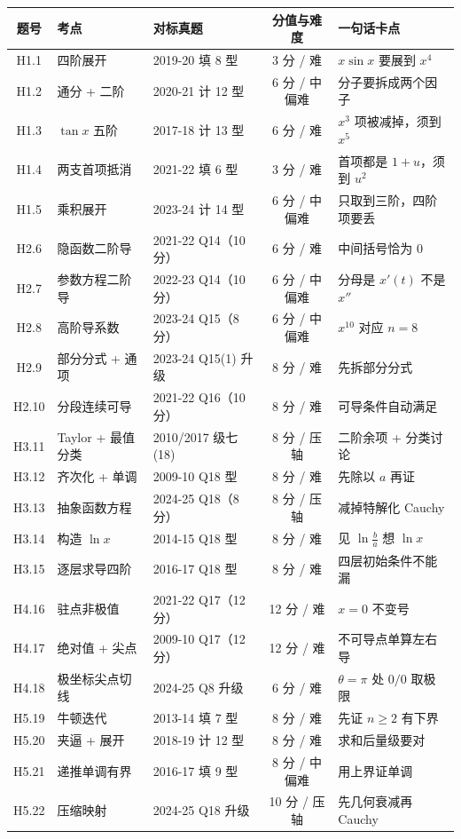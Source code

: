 \documentclass[11pt,a4paper]{ctexart}
\begin{document}
\begin{center}
\small\setlength{\tabcolsep}{4pt}
\begin{tabularx}{\linewidth}{c|l|l|c|X}
\toprule
题号 & 考点 & 对标真题 & 分值与难度 & 一句话卡点 \\
\midrule
H1.1 & 四阶展开 & 2019-20 填 8 型 & 3 分 / 难 & $x\sin x$ 要展到 $x^4$ \\
H1.2 & 通分 + 二阶 & 2020-21 计 12 型 & 6 分 / 中偏难 & 分子要拆成两个因子 \\
H1.3 & $\tan x$ 五阶 & 2017-18 计 13 型 & 6 分 / 难 & $x^3$ 项被减掉，须到 $x^5$ \\
H1.4 & 两支首项抵消 & 2021-22 填 6 型 & 3 分 / 难 & 首项都是 $1+u$，须到 $u^2$ \\
H1.5 & 乘积展开 & 2023-24 计 14 型 & 6 分 / 中偏难 & 只取到三阶，四阶项要丢 \\
\midrule
H2.6 & 隐函数二阶导 & 2021-22 Q14（10 分） & 6 分 / 难 & 中间括号恰为 0 \\
H2.7 & 参数方程二阶导 & 2022-23 Q14（10 分） & 6 分 / 中偏难 & 分母是 $x'(t)$ 不是 $x''$ \\
H2.8 & 高阶导系数 & 2023-24 Q15（8 分） & 6 分 / 中偏难 & $x^{10}$ 对应 $n=8$ \\
H2.9 & 部分分式 + 通项 & 2023-24 Q15(1) 升级 & 8 分 / 难 & 先拆部分分式 \\
H2.10 & 分段连续可导 & 2021-22 Q16（10 分） & 8 分 / 难 & 可导条件自动满足 \\
\midrule
H3.11 & Taylor + 最值分类 & 2010/2017 级七(18) & 8 分 / 压轴 & 二阶余项 + 分类讨论 \\
H3.12 & 齐次化 + 单调 & 2009-10 Q18 型 & 8 分 / 难 & 先除以 $a$ 再证 \\
H3.13 & 抽象函数方程 & 2024-25 Q18（8 分） & 8 分 / 压轴 & 减掉特解化 Cauchy \\
H3.14 & 构造 $\ln x$ & 2014-15 Q18 型 & 8 分 / 难 & 见 $\ln\frac ba$ 想 $\ln x$ \\
H3.15 & 逐层求导四阶 & 2016-17 Q18 型 & 8 分 / 难 & 四层初始条件不能漏 \\
\midrule
H4.16 & 驻点非极值 & 2021-22 Q17（12 分） & 12 分 / 难 & $x=0$ 不变号 \\
H4.17 & 绝对值 + 尖点 & 2009-10 Q17（12 分） & 12 分 / 难 & 不可导点单算左右导 \\
H4.18 & 极坐标尖点切线 & 2024-25 Q8 升级 & 6 分 / 难 & $\theta=\pi$ 处 $0/0$ 取极限 \\
\midrule
H5.19 & 牛顿迭代 & 2013-14 填 7 型 & 8 分 / 难 & 先证 $n\ge2$ 有下界 \\
H5.20 & 夹逼 + 展开 & 2018-19 计 12 型 & 8 分 / 难 & 求和后量级要对 \\
H5.21 & 递推单调有界 & 2016-17 填 9 型 & 8 分 / 中偏难 & 用上界证单调 \\
H5.22 & 压缩映射 & 2024-25 Q18 升级 & 10 分 / 压轴 & 先几何衰减再 Cauchy \\
\bottomrule
\end{tabularx}
\end{center}
\end{document}
